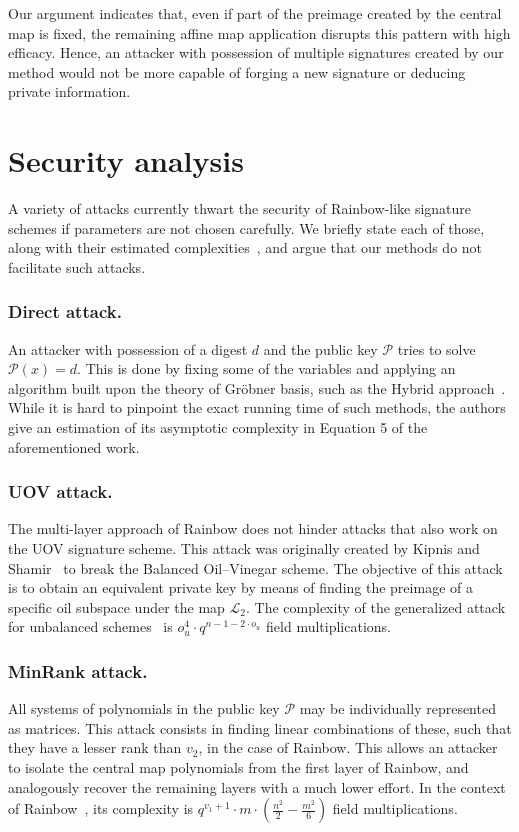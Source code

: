 \documentclass[draft, 12pt, a4paper, oneside]{memoir}
\theoremstyle{definition}
\begin{document}

Our argument indicates that, even if part of the preimage created by the
central map is fixed, the remaining affine map application disrupts this
pattern with high efficacy. Hence, an attacker with possession of multiple
signatures created by our method would not be more capable of forging a new
signature or deducing private information.

\section{Security analysis}\label{subsec:analysis}

A variety of attacks currently thwart the security of Rainbow-like signature
schemes if parameters are not chosen carefully. We briefly state each of
those, along with their estimated complexities~\cite{Petzoldt:201005},
and argue that our methods do not facilitate such attacks.

\subsubsection{Direct attack.} An attacker with possession of a digest $d$ and
the public key $\mathcal{P}$ tries to solve $\mathcal{P}(x) = d$. This is done
by fixing some of the variables and applying an algorithm built upon the theory
of Gröbner basis, such as the Hybrid approach~\cite{Bettale:201207}.
While it is hard to pinpoint the exact running time of such methods, the
authors give an estimation of its asymptotic complexity in Equation 5 of the
aforementioned work.

\subsubsection{UOV attack.} The multi-layer approach of Rainbow does not hinder
attacks that also work on the UOV signature scheme. This attack was originally
created by Kipnis and Shamir~\cite{Kipnis:199808} to break the Balanced
Oil--Vinegar scheme. The objective of this attack is to obtain an equivalent
private key by means of finding the preimage of a specific oil subspace under
the map $\mathcal{L}_{2}$. The complexity of the generalized attack for unbalanced
schemes~\cite{Kipnis:199904} is
$o_{u}^{4} \cdot q^{n - 1 - 2 \cdot o_{u}}$ field multiplications.

\subsubsection{MinRank attack.} All systems of polynomials in the public key
$\mathcal{P}$ may be individually represented as matrices. This attack
consists in finding linear combinations of these, such that they have a lesser
rank than $v_{2}$, in the case of Rainbow. This allows an attacker to isolate
the central map polynomials from the first layer of Rainbow, and analogously
recover the remaining layers with a much lower effort. In the context of
Rainbow~\cite{Billet:200609}, its complexity is
$q^{v_{1} + 1} \cdot m \cdot (\frac{n^{2}}{2} - \frac{m^{2}}{6})$ field
multiplications.
\end{document}

